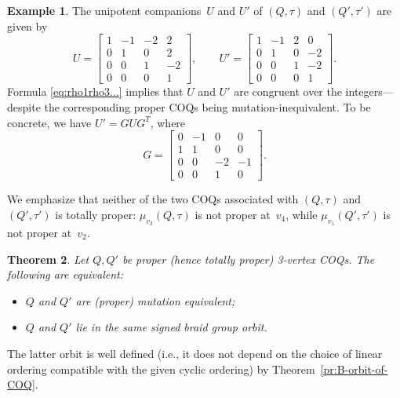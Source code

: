 \documentclass[11pt, letterpaper]{amsart}
\newtheorem{theorem}{Theorem}[section]
\theoremstyle{definition}
\newtheorem{example}[theorem]{Example}
\numberwithin{equation}{section}
\begin{document}
\begin{example}
The unipotent companions~$U$ and $U'$ of $(Q,\tau)$ and $(Q',\tau')$ are given by 
\begin{equation*}
U=\begin{bmatrix}
1 & -1 & -2 & 2\\
0 & 1 & 0 & 2 \\
0 & 0 & 1 & -2\\
0 & 0 & 0 & 1
\end{bmatrix},
\qquad 
U'=\begin{bmatrix}
1 & -1 & 2 & 0\\
0 & 1 & 0 & -2\\
0 & 0 & 1 & -2\\
0 & 0 & 0 & 1
\end{bmatrix}. 
\end{equation*}
Formula \eqref{eq:rho1rho3...} implies that $U$ and $U'$ are congruent over the integers---despite 
the corresponding proper COQs being mutation-inequivalent.
To be concrete, we have $U' = G U G^T$, where
\begin{equation*}
G=\begin{bmatrix}
0 & -1 & 0 & 0\\
1 & 1 & 0 & 0\\
0 & 0 & -2 & -1\\
0 & 0 & 1 & 0
\end{bmatrix}. 
\end{equation*}

We emphasize that neither of the two COQs associated with $(Q,\tau)$ and $(Q',\tau')$ 
is totally proper: $\mu_{v_3}(Q,\tau)$ is not proper at~$v_4$, while
$\mu_{v_1}(Q',\tau')$ is not proper at~$v_2$. 
\end{example}


\begin{theorem}
\label{th:signed-braid-n=3}
Let $Q, Q'$ be proper (hence totally proper) 3-vertex COQs.
The following are equivalent:
\begin{itemize}[leftmargin=.3in]
\item[\rm(i)]
$Q$ and $Q'$ are (proper) mutation equivalent; 
\item[\rm(ii)]
$Q$ and $Q'$ lie in the same signed braid group orbit. 
\end{itemize}
\end{theorem}

The latter orbit is well defined (i.e., it does not depend on the choice of linear ordering compatible with the given cyclic ordering) by Theorem~\ref{pr:B-orbit-of-COQ}. %
\end{document}
